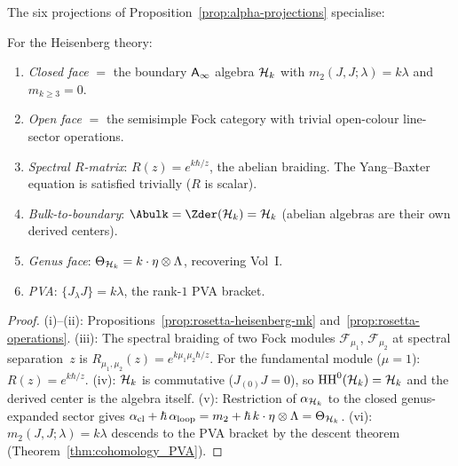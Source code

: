 The six projections of Proposition~\ref{prop:alpha-projections} specialise:

\begin{corollary}
\label{cor:rosetta-heisenberg-projections}
For the Heisenberg theory:
\begin{enumerate}[label=\textup{(\roman*)}]
\item \emph{Closed face} $=$ the boundary $\mathsf{A}_{\infty}$ algebra $\mathcal{H}_k$
 with $m_2(J,J;\lambda) = k\lambda$ and $m_{k \ge 3} = 0$.
\item \emph{Open face} $=$ the semisimple Fock category with
 trivial open-colour line-sector operations.
\item \emph{Spectral $R$-matrix}: $R(z) = e^{k\hbar/z}$, the
 abelian braiding. The Yang--Baxter equation is satisfied
 trivially \textup{(}$R$ is scalar\textup{)}.
\item \emph{Bulk-to-boundary}: $\Abulk = \Zder(\cH_k) = \cH_k$
 \textup{(}abelian algebras are their own derived centers\textup{)}.
\item \emph{Genus face}: $\Theta_{\mathcal{H}_k} = k \cdot \eta \otimes
 \Lambda$, recovering Vol~I\@.
\item \emph{PVA}: $\{J_\lambda J\} = k\lambda$, the rank-$1$ PVA
 bracket.
\end{enumerate}
\end{corollary}

\begin{proof}
(i)--(ii): Propositions~\ref{prop:rosetta-heisenberg-mk}
and~\ref{prop:rosetta-operations}.
(iii): The spectral braiding of two Fock modules $\mathcal{F}_{\mu_1}$,
$\mathcal{F}_{\mu_2}$ at spectral separation~$z$ is
$R_{\mu_1,\mu_2}(z) = e^{k\mu_1\mu_2\hbar/z}$. For the fundamental
module ($\mu = 1$): $R(z) = e^{k\hbar/z}$.
(iv): $\mathcal{H}_k$ is commutative ($J_{(0)}J = 0$), so
$\operatorname{HH}^0(\mathcal{H}_k) = \mathcal{H}_k$ and the derived center is the algebra
itself.
(v): Restriction of $\alpha_{\mathcal{H}_k}$ to the closed genus-expanded
sector gives $\alpha_{\mathrm{cl}} + \hbar\,\alpha_{\mathrm{loop}}
= m_2 + \hbar\,k\cdot\eta\otimes\Lambda = \Theta_{\mathcal{H}_k}$.
(vi): $m_2(J,J;\lambda) = k\lambda$ descends to the PVA bracket
by the descent theorem
(Theorem~\ref{thm:cohomology_PVA}).
\end{proof}

